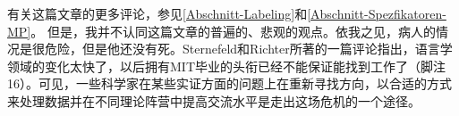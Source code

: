 {{  有关这篇文章的更多评论，参见\ref{Abschnitt-Labeling}和\ref{Abschnitt-Spezfikatoren-MP}。
}
%
但是，我并不认同这篇文章的普遍的、悲观的观点。依我之见，病人的情况是很危险，但是他还没有死。Sternefeld和Richter所著的一篇评论指出，语言学领域的变化太快了，以后拥有MIT毕业的头衔已经不能保证能找到工作了（脚注16）。可见，一些科学家在某些实证方面的问题上在重新寻找方向，以合适的方式来处理数据并在不同理论阵营中提高交流水平是走出这场危机的一个途径。

}
